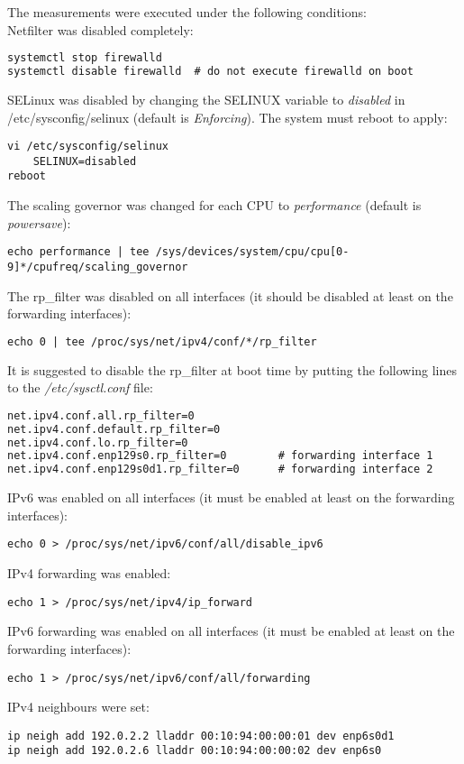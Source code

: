 The measurements were executed under the following conditions:
\\
Netfilter was disabled completely:
\begin{lstlisting}[language=TeX]
systemctl stop firewalld
systemctl disable firewalld  # do not execute firewalld on boot
\end{lstlisting}
SELinux was disabled by changing the SELINUX variable to {\it{disabled}} in /etc/sysconfig/selinux
(default is {\it{Enforcing}}). The system must reboot to apply:
\begin{lstlisting}
vi /etc/sysconfig/selinux
	SELINUX=disabled
reboot
\end{lstlisting}
The scaling governor was changed for each CPU to {\it{performance}} (default is {\it{powersave}}):
\begin{lstlisting}
echo performance | tee /sys/devices/system/cpu/cpu[0-9]*/cpufreq/scaling_governor
\end{lstlisting}
The rp\_filter was disabled on all interfaces (it should be disabled at least on the forwarding interfaces):
\begin{lstlisting}[language=TeX]
echo 0 | tee /proc/sys/net/ipv4/conf/*/rp_filter
\end{lstlisting}
It is suggested to disable the rp\_filter at boot time by putting the following lines to the {\it{/etc/sysctl.conf}} file:
\begin{lstlisting}[language=TeX]
net.ipv4.conf.all.rp_filter=0
net.ipv4.conf.default.rp_filter=0
net.ipv4.conf.lo.rp_filter=0
net.ipv4.conf.enp129s0.rp_filter=0        # forwarding interface 1
net.ipv4.conf.enp129s0d1.rp_filter=0      # forwarding interface 2
\end{lstlisting}
IPv6 was enabled on all interfaces (it must be enabled at least on the forwarding interfaces):
\begin{lstlisting}
echo 0 > /proc/sys/net/ipv6/conf/all/disable_ipv6
\end{lstlisting}
IPv4 forwarding was enabled:
\begin{lstlisting}
echo 1 > /proc/sys/net/ipv4/ip_forward
\end{lstlisting}
IPv6 forwarding was enabled on all interfaces (it must be enabled at least on the forwarding interfaces):
\begin{lstlisting}
echo 1 > /proc/sys/net/ipv6/conf/all/forwarding
\end{lstlisting}
IPv4 neighbours were set:
\begin{lstlisting}
ip neigh add 192.0.2.2 lladdr 00:10:94:00:00:01 dev enp6s0d1
ip neigh add 192.0.2.6 lladdr 00:10:94:00:00:02 dev enp6s0
\end{lstlisting}
